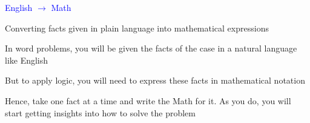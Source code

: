 \documentclass[14pt,fleqn]{extarticle}
\begin{document}
 
\begin{skill}
    \begin{narrow}
         \textcolor{blue}{English $\to$ Math}
         
         Converting facts given in plain language into mathematical expressions
    \end{narrow}
    
    \reason 
    
    In word problems, you will be given the facts of the case in a natural language like English \newline 
    
    But to apply logic, you will need to express these facts in mathematical notation\newline 
    
    Hence, take one fact at a time and write the Math for it. As you do, you will start getting insights into how to solve the problem
\end{skill}
\end{document}
